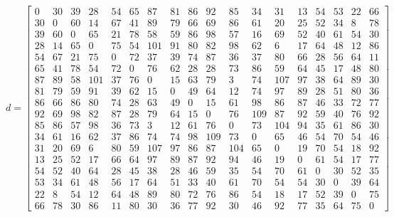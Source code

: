 \begin{equation}d=\left[\begin{array}{cccccccccccccccccc}0 & 30 & 39 & 28 & 54 & 65 & 87 & 81 & 86 & 92 & 85 & 34 & 31 & 13 & 54 & 53 & 22 & 66\\30 & 0 & 60 & 14 & 67 & 41 & 89 & 79 & 66 & 69 & 86 & 61 & 20 & 25 & 52 & 34 & 8 & 78\\39 & 60 & 0 & 65 & 21 & 78 & 58 & 59 & 86 & 98 & 57 & 16 & 69 & 52 & 40 & 61 & 54 & 30\\28 & 14 & 65 & 0 & 75 & 54 & 101 & 91 & 80 & 82 & 98 & 62 & 6 & 17 & 64 & 48 & 12 & 86\\54 & 67 & 21 & 75 & 0 & 72 & 37 & 39 & 74 & 87 & 36 & 37 & 80 & 66 & 28 & 56 & 64 & 11\\65 & 41 & 78 & 54 & 72 & 0 & 76 & 62 & 28 & 28 & 73 & 86 & 59 & 64 & 45 & 17 & 48 & 80\\87 & 89 & 58 & 101 & 37 & 76 & 0 & 15 & 63 & 79 & 3 & 74 & 107 & 97 & 38 & 64 & 89 & 30\\81 & 79 & 59 & 91 & 39 & 62 & 15 & 0 & 49 & 64 & 12 & 74 & 97 & 89 & 28 & 51 & 80 & 36\\86 & 66 & 86 & 80 & 74 & 28 & 63 & 49 & 0 & 15 & 61 & 98 & 86 & 87 & 46 & 33 & 72 & 77\\92 & 69 & 98 & 82 & 87 & 28 & 79 & 64 & 15 & 0 & 76 & 109 & 87 & 92 & 59 & 40 & 76 & 92\\85 & 86 & 57 & 98 & 36 & 73 & 3 & 12 & 61 & 76 & 0 & 73 & 104 & 94 & 35 & 61 & 86 & 30\\34 & 61 & 16 & 62 & 37 & 86 & 74 & 74 & 98 & 109 & 73 & 0 & 65 & 46 & 54 & 70 & 54 & 46\\31 & 20 & 69 & 6 & 80 & 59 & 107 & 97 & 86 & 87 & 104 & 65 & 0 & 19 & 70 & 54 & 18 & 92\\13 & 25 & 52 & 17 & 66 & 64 & 97 & 89 & 87 & 92 & 94 & 46 & 19 & 0 & 61 & 54 & 17 & 77\\54 & 52 & 40 & 64 & 28 & 45 & 38 & 28 & 46 & 59 & 35 & 54 & 70 & 61 & 0 & 30 & 52 & 35\\53 & 34 & 61 & 48 & 56 & 17 & 64 & 51 & 33 & 40 & 61 & 70 & 54 & 54 & 30 & 0 & 39 & 64\\22 & 8 & 54 & 12 & 64 & 48 & 89 & 80 & 72 & 76 & 86 & 54 & 18 & 17 & 52 & 39 & 0 & 75\\66 & 78 & 30 & 86 & 11 & 80 & 30 & 36 & 77 & 92 & 30 & 46 & 92 & 77 & 35 & 64 & 75 & 0\end{array}\right]\label{eqn:tsp}\end{equation}
